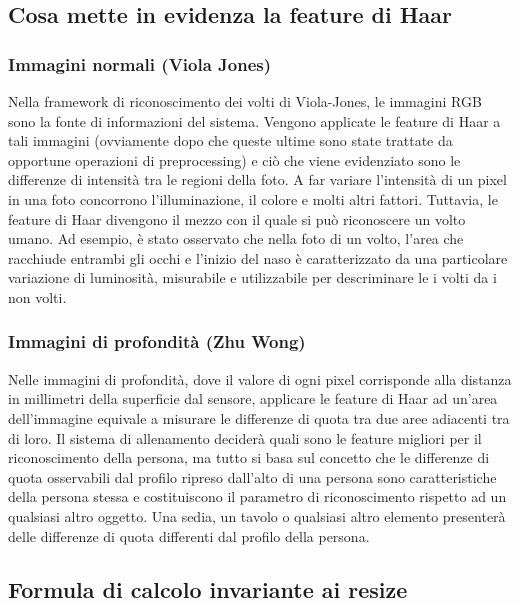         \subsection{Cosa mette in evidenza la feature di Haar}
            \subsubsection{Immagini normali (Viola Jones)}
            Nella framework di riconoscimento dei volti di Viola-Jones, le immagini RGB sono la fonte di informazioni del sistema.
            Vengono applicate le feature di Haar a tali immagini (ovviamente dopo che queste ultime sono state trattate da opportune operazioni di preprocessing) e ciò che viene evidenziato sono le differenze di intensità tra le regioni della foto.
            A far variare l'intensità di un pixel in una foto concorrono l'illuminazione, il colore e molti altri fattori.
            Tuttavia, le feature di Haar divengono il mezzo con il quale si può riconoscere un volto umano.
            Ad esempio, è stato osservato che nella foto di un volto, l'area che racchiude entrambi gli occhi e l'inizio del naso è caratterizzato da una particolare variazione di luminosità, misurabile e utilizzabile per descriminare le i volti da i non volti.

            \subsubsection{Immagini di profondità (Zhu Wong)}
            Nelle immagini di profondità, dove il valore di ogni pixel corrisponde alla distanza in millimetri della superficie dal sensore, applicare le feature di Haar ad un'area dell'immagine equivale a misurare le differenze di quota tra due aree adiacenti tra di loro.
            Il sistema di allenamento deciderà quali sono le feature migliori per il riconoscimento della persona, ma tutto si basa sul concetto che le differenze di quota osservabili dal profilo ripreso dall'alto di una persona sono caratteristiche della persona stessa e costituiscono il parametro di riconoscimento rispetto ad un qualsiasi altro oggetto.
            Una sedia, un tavolo o qualsiasi altro elemento presenterà delle differenze di quota differenti dal profilo della persona.

        \subsection{Formula di calcolo invariante ai resize}

